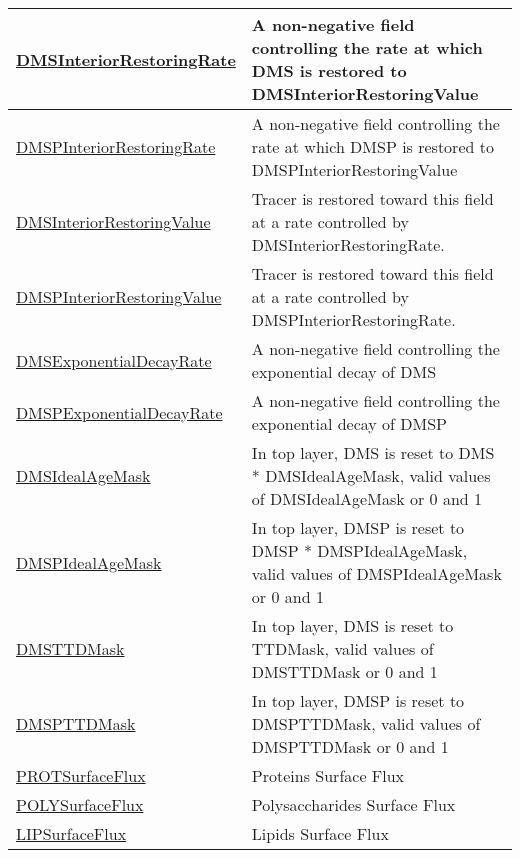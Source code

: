 {\begin{center}
\begin{longtable}{| p{2.0in} | p{4.0in} |}
    \hline
    \hyperref[subsec:var_sec_forcing_DMSInteriorRestoringRate]{DMSInteriorRestoringRate} & A non-negative field controlling the rate at which DMS is restored to DMSInteriorRestoringValue \\
    \hline
    \hyperref[subsec:var_sec_forcing_DMSPInteriorRestoringRate]{DMSPInteriorRestoringRate} & A non-negative field controlling the rate at which DMSP is restored to DMSPInteriorRestoringValue \\
    \hline
    \hyperref[subsec:var_sec_forcing_DMSInteriorRestoringValue]{DMSInteriorRestoringValue} & Tracer is restored toward this field at a rate controlled by DMSInteriorRestoringRate. \\
    \hline
    \hyperref[subsec:var_sec_forcing_DMSPInteriorRestoringValue]{DMSPInteriorRestoringValue} & Tracer is restored toward this field at a rate controlled by DMSPInteriorRestoringRate. \\
    \hline
    \hyperref[subsec:var_sec_forcing_DMSExponentialDecayRate]{DMSExponentialDecayRate} & A non-negative field controlling the exponential decay of DMS \\
    \hline
    \hyperref[subsec:var_sec_forcing_DMSPExponentialDecayRate]{DMSPExponentialDecayRate} & A non-negative field controlling the exponential decay of DMSP \\
    \hline
    \hyperref[subsec:var_sec_forcing_DMSIdealAgeMask]{DMSIdealAgeMask} & In top layer, DMS is reset to DMS * DMSIdealAgeMask, valid values of DMSIdealAgeMask or 0 and 1 \\
    \hline
    \hyperref[subsec:var_sec_forcing_DMSPIdealAgeMask]{DMSPIdealAgeMask} & In top layer, DMSP is reset to DMSP * DMSPIdealAgeMask, valid values of DMSPIdealAgeMask or 0 and 1 \\
    \hline
    \hyperref[subsec:var_sec_forcing_DMSTTDMask]{DMSTTDMask} & In top layer, DMS is reset to TTDMask, valid values of DMSTTDMask or 0 and 1 \\
    \hline
    \hyperref[subsec:var_sec_forcing_DMSPTTDMask]{DMSPTTDMask} & In top layer, DMSP is reset to DMSPTTDMask, valid values of DMSPTTDMask or 0 and 1 \\
    \hline
    \hyperref[subsec:var_sec_forcing_PROTSurfaceFlux]{PROTSurfaceFlux} & Proteins Surface Flux \\
    \hline
    \hyperref[subsec:var_sec_forcing_POLYSurfaceFlux]{POLYSurfaceFlux} & Polysaccharides Surface Flux \\
    \hline
    \hyperref[subsec:var_sec_forcing_LIPSurfaceFlux]{LIPSurfaceFlux} & Lipids Surface Flux \\

\end{longtable}
\end{center}}
